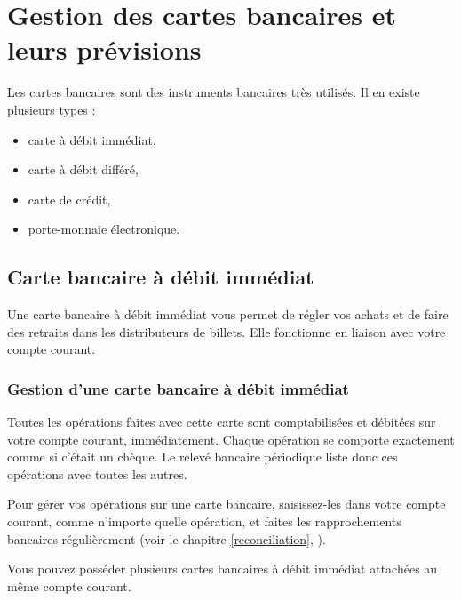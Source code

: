 
\chapter{Gestion des cartes bancaires et leurs prévisions\label{bankcard} }

Les cartes bancaires sont des instruments bancaires très utilisés. Il en existe plusieurs types :

\begin{itemize}
	 \item carte à débit immédiat,
	 \item carte à débit différé,
 	 \item carte de crédit,
 	 \item porte-monnaie électronique.
\end{itemize}


\section{Carte bancaire à débit immédiat\label{bankcard-quickCard}}


Une carte bancaire à débit immédiat vous permet de régler vos achats et de faire des retraits dans les distributeurs de billets. Elle fonctionne en liaison avec votre compte courant. 


\subsection{Gestion d'une carte bancaire à débit immédiat\label{bankcard-quickCard-manage}}

Toutes les opérations faites avec cette carte sont comptabilisées et débitées sur votre compte courant, immédiatement. Chaque opération se comporte exactement comme si c'était un chèque. Le relevé bancaire périodique liste donc ces opérations avec toutes les autres.

Pour gérer vos opérations sur une carte bancaire, saisissez-les dans votre compte courant, comme n'importe quelle opération, et faites les rapprochements bancaires régulièrement (voir le chapitre \vref{reconciliation}, ).

Vous pouvez posséder plusieurs cartes bancaires à débit immédiat attachées au même compte courant. 


